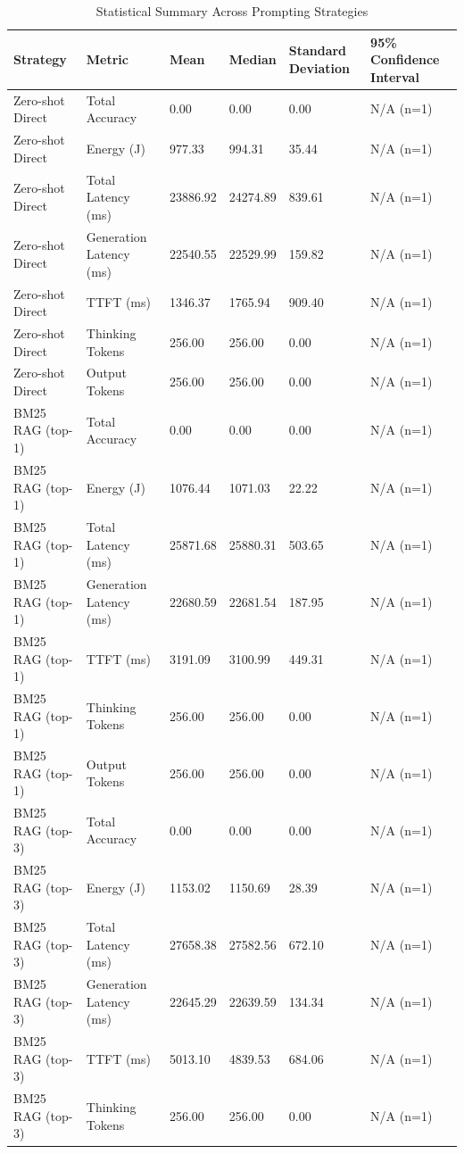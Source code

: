 \begin{table}
\caption{Statistical Summary Across Prompting Strategies}
\label{tab:statistical_summary}
\begin{tabular}{llllll}
\toprule
Strategy & Metric & Mean & Median & Standard Deviation & 95\% Confidence Interval \\
\midrule
Zero-shot Direct & Total Accuracy & 0.00 & 0.00 & 0.00 & N/A (n=1) \\
Zero-shot Direct & Energy (J) & 977.33 & 994.31 & 35.44 & N/A (n=1) \\
Zero-shot Direct & Total Latency (ms) & 23886.92 & 24274.89 & 839.61 & N/A (n=1) \\
Zero-shot Direct & Generation Latency (ms) & 22540.55 & 22529.99 & 159.82 & N/A (n=1) \\
Zero-shot Direct & TTFT (ms) & 1346.37 & 1765.94 & 909.40 & N/A (n=1) \\
Zero-shot Direct & Thinking Tokens & 256.00 & 256.00 & 0.00 & N/A (n=1) \\
Zero-shot Direct & Output Tokens & 256.00 & 256.00 & 0.00 & N/A (n=1) \\
BM25 RAG (top-1) & Total Accuracy & 0.00 & 0.00 & 0.00 & N/A (n=1) \\
BM25 RAG (top-1) & Energy (J) & 1076.44 & 1071.03 & 22.22 & N/A (n=1) \\
BM25 RAG (top-1) & Total Latency (ms) & 25871.68 & 25880.31 & 503.65 & N/A (n=1) \\
BM25 RAG (top-1) & Generation Latency (ms) & 22680.59 & 22681.54 & 187.95 & N/A (n=1) \\
BM25 RAG (top-1) & TTFT (ms) & 3191.09 & 3100.99 & 449.31 & N/A (n=1) \\
BM25 RAG (top-1) & Thinking Tokens & 256.00 & 256.00 & 0.00 & N/A (n=1) \\
BM25 RAG (top-1) & Output Tokens & 256.00 & 256.00 & 0.00 & N/A (n=1) \\
BM25 RAG (top-3) & Total Accuracy & 0.00 & 0.00 & 0.00 & N/A (n=1) \\
BM25 RAG (top-3) & Energy (J) & 1153.02 & 1150.69 & 28.39 & N/A (n=1) \\
BM25 RAG (top-3) & Total Latency (ms) & 27658.38 & 27582.56 & 672.10 & N/A (n=1) \\
BM25 RAG (top-3) & Generation Latency (ms) & 22645.29 & 22639.59 & 134.34 & N/A (n=1) \\
BM25 RAG (top-3) & TTFT (ms) & 5013.10 & 4839.53 & 684.06 & N/A (n=1) \\
BM25 RAG (top-3) & Thinking Tokens & 256.00 & 256.00 & 0.00 & N/A (n=1) \\

\end{tabular}
\end{table}
